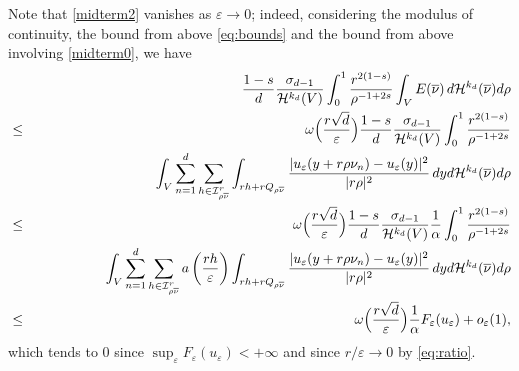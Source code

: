 \documentclass[11pt,a4paper,reqno]{amsart}
\theoremstyle{plain}
\theoremstyle{definition}
\newcommand\e{\varepsilon}
\theoremstyle{remark}
\begin{document}
Note that \eqref{midterm2} vanishes as $\e\to0$; indeed, considering the modulus of continuity, the bound from above \eqref{eq:bounds} and the bound from above involving \eqref{midterm0}, we have
\begin{eqnarray*} && \nonumber
\hskip-1cm  \frac{1-s}{d} \frac{\sigma_{d-1}}{\mathcal{H}^{k_d}(V)} \int_0^1  \frac{r^{2(1-s)}}{\rho^{-1+2s}} \int_V E(\overline{\nu})\,  d\mathcal{H}^{k_d}(\overline{\nu}) d\rho \\ \nonumber
    &\leq& \omega\Bigl(\frac{r\sqrt{d}}{\e}\Bigr)\frac{1-s}{d} \frac{\sigma_{d-1}}{\mathcal{H}^{k_d}(V)}\int_0^1  \frac{r^{2(1-s)}}{\rho^{-1+2s}} \\ \nonumber
    && \qquad \qquad \qquad \qquad \int_V \sum_{n=1}^d \sum_{h\in \mathcal{I}^{r}_{{\rho\overline{\nu}}}}  \int_{rh+rQ_{\rho\overline{\nu}}} \frac{|u_\e(y+r\rho\nu_n)-u_\e(y)|^2}{|r\rho|^2}\, dy d\mathcal{H}^{k_d}(\overline{\nu})d\rho \\ \nonumber
    &\leq& \omega\Bigl(\frac{r\sqrt{d}}{\e}\Bigr)\frac{1-s}{d} \frac{\sigma_{d-1}}{\mathcal{H}^{k_d}(V)}\frac{1}{\alpha}\int_0^1  \frac{r^{2(1-s)}}{\rho^{-1+2s}} \\ \nonumber
    && \qquad \quad \qquad \int_V \sum_{n=1}^d \sum_{h\in \mathcal{I}^{r}_{{\rho\overline{\nu}}}}  a\left(\frac{rh}{\e}\right) \int_{rh+rQ_{\rho\overline{\nu}}}\frac{|u_\e(y+r\rho\nu_n)-u_\e(y)|^2}{|r\rho|^2}\, dy d\mathcal{H}^{k_d}(\overline{\nu})d\rho \\ \nonumber
    &\leq& \omega\Bigl(\frac{r\sqrt{d}}{\e}\Bigr)\frac{1}{\alpha}F_\e(u_\e)+o_\e(1),
\end{eqnarray*}
which tends to $0$ since $\sup_\e F_\e(u_\e)<+\infty$ and since $r/\e\to0$ by \eqref{eq:ratio}.
\end{document}
